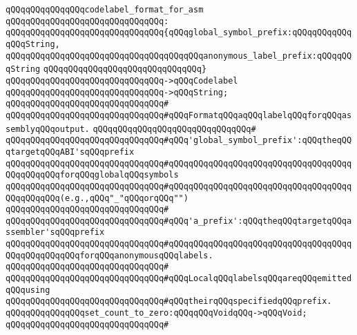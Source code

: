 \newline
\newline
\verb|qQQqqQQqqQQqqQQqcodelabel_format_for_asm|\newline
\verb|qQQqqQQqqQQqqQQqqQQqqQQqqQQqqQQq:|\newline
\verb|qQQqqQQqqQQqqQQqqQQqqQQqqQQqqQQq{qQQqglobal_symbol_prefix:qQQqqQQqqQQqqQQqString,|\newline
\verb|qQQqqQQqqQQqqQQqqQQqqQQqqQQqqQQqqQQqqQQqanonymous_label_prefix:qQQqqQQqString|\newline
\verb|qQQqqQQqqQQqqQQqqQQqqQQqqQQqqQQq}|\newline
\verb|qQQqqQQqqQQqqQQqqQQqqQQqqQQqqQQq->qQQqCodelabel|\newline
\verb|qQQqqQQqqQQqqQQqqQQqqQQqqQQqqQQq->qQQqString;|\newline
\verb|qQQqqQQqqQQqqQQqqQQqqQQqqQQqqQQq#|\newline
\verb|qQQqqQQqqQQqqQQqqQQqqQQqqQQqqQQq#qQQqFormatqQQqaqQQqlabelqQQqforqQQqassemblyqQQqoutput.|\newline
\verb|qQQqqQQqqQQqqQQqqQQqqQQqqQQqqQQq#|\newline
\verb|qQQqqQQqqQQqqQQqqQQqqQQqqQQqqQQq#qQQq'global_symbol_prefix':qQQqtheqQQqtargetqQQqABI'sqQQqprefix|\newline
\verb|qQQqqQQqqQQqqQQqqQQqqQQqqQQqqQQq#qQQqqQQqqQQqqQQqqQQqqQQqqQQqqQQqqQQqqQQqqQQqqQQqforqQQqglobalqQQqsymbols|\newline
\verb|qQQqqQQqqQQqqQQqqQQqqQQqqQQqqQQq#qQQqqQQqqQQqqQQqqQQqqQQqqQQqqQQqqQQqqQQqqQQqqQQq(e.g.,qQQq"_"qQQqorqQQq"")|\newline
\verb|qQQqqQQqqQQqqQQqqQQqqQQqqQQqqQQq#|\newline
\verb|qQQqqQQqqQQqqQQqqQQqqQQqqQQqqQQq#qQQq'a_prefix':qQQqtheqQQqtargetqQQqassembler'sqQQqprefix|\newline
\verb|qQQqqQQqqQQqqQQqqQQqqQQqqQQqqQQq#qQQqqQQqqQQqqQQqqQQqqQQqqQQqqQQqqQQqqQQqqQQqqQQqqQQqforqQQqanonymousqQQqlabels.|\newline
\verb|qQQqqQQqqQQqqQQqqQQqqQQqqQQqqQQq#|\newline
\verb|qQQqqQQqqQQqqQQqqQQqqQQqqQQqqQQq#qQQqLocalqQQqlabelsqQQqareqQQqemittedqQQqusing|\newline
\verb|qQQqqQQqqQQqqQQqqQQqqQQqqQQqqQQq#qQQqtheirqQQqspecifiedqQQqprefix.|\newline
\newline
\verb|qQQqqQQqqQQqqQQqset_count_to_zero:qQQqqQQqVoidqQQq->qQQqVoid;|\newline
\verb|qQQqqQQqqQQqqQQqqQQqqQQqqQQqqQQq#|\newline
